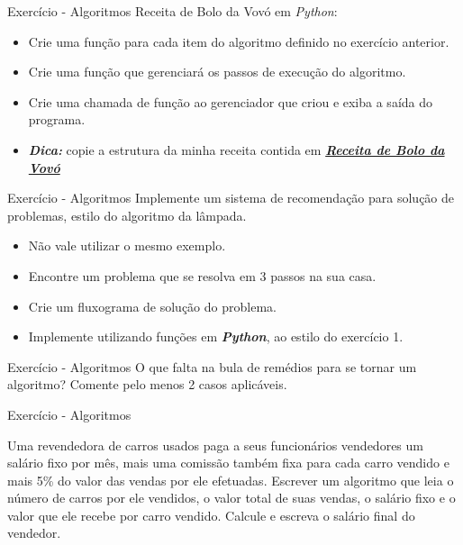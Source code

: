 \documentclass{beamer}
\begin{document}
\begin{frame}{Exercício - Algoritmos}
	\label{exercicio_02}
	Receita de Bolo da Vovó em \textit{Python}:
	\begin{itemize}
		\item Crie uma função para cada item do algoritmo definido no exercício anterior.
		\item Crie uma função que gerenciará os passos de execução do algoritmo.
		\item Crie uma chamada de função ao gerenciador que criou e exiba a saída do programa.
		\item \textbf{\textit{Dica:}} copie a estrutura da minha receita contida em \href{Exercicios/Modulo_01/exercicio_01/receita_de_bolo.py}{\textbf{\textit{Receita de Bolo da Vovó}}}
	\end{itemize}
\end{frame}


\begin{frame}{Exercício - Algoritmos}
	\label{exercicio_03}
	Implemente um sistema de recomendação para solução de problemas, estilo do algoritmo da lâmpada.
	\begin{itemize}
		\item Não vale utilizar o mesmo exemplo.
		\item Encontre um problema que se resolva em 3 passos na sua casa.
		\item Crie um fluxograma de solução do problema.
		\item Implemente utilizando funções em \textbf{\textit{Python}}, ao estilo do exercício 1.
	\end{itemize}
\end{frame}

\begin{frame}{Exercício - Algoritmos}
	\label{exercicio_04}
	 O que falta na bula de remédios para se tornar um algoritmo? Comente pelo menos 2 casos aplicáveis.
\end{frame}


\begin{frame}{Exercício - Algoritmos}
	\label{exercicio_05}
	
	Uma revendedora de carros usados paga a seus funcionários vendedores um salário fixo por mês,	mais uma comissão também fixa para cada carro vendido e mais 5\% do valor das vendas por ele	efetuadas. Escrever um algoritmo que leia o número de carros por ele vendidos, o valor total de suas vendas, o salário fixo e o valor que ele recebe por carro vendido. Calcule e escreva o salário final do vendedor.
	
\end{frame}
\end{document}
